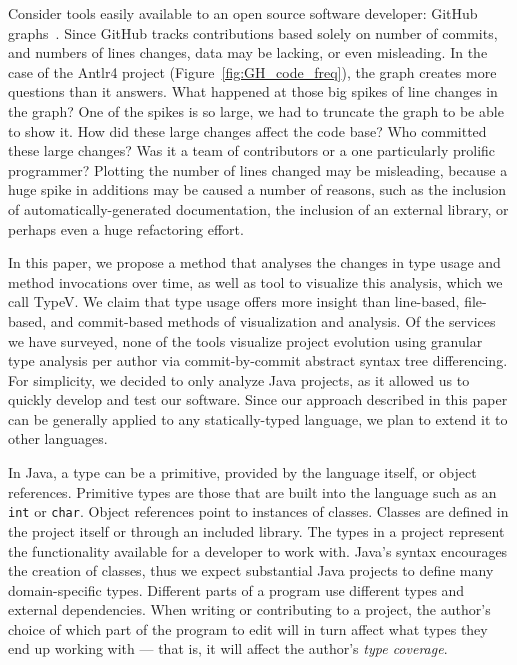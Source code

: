 \documentclass[conference]{IEEEtran}
\begin{document}
Consider tools easily available to an open source software developer: GitHub graphs~\cite{github-graphs}. Since GitHub tracks contributions based solely on number of commits, and numbers of lines changes, data may be lacking, or even misleading. In the case of the Antlr4 project (Figure~\ref{fig:GH_code_freq}), the graph creates more questions than it answers. What happened at those big spikes of line changes in the graph? One of the spikes is so large, we had to truncate the graph to be able to show it. How did these large changes affect the code base? Who committed these large changes? Was it a team of contributors or a one particularly prolific programmer? Plotting the number of lines changed may be misleading, because a huge spike in additions may be caused a number of reasons, such as the inclusion of automatically-generated documentation, the inclusion of an external library, or perhaps even a huge refactoring effort.

In this paper, we propose a method that analyses the changes in type usage and method invocations over time, as well as tool to visualize this analysis, which we call TypeV. We claim that type usage offers more insight than line-based, file-based, and commit-based methods of visualization and analysis. Of the services we have surveyed, none of the tools visualize project evolution using granular type analysis per author via commit-by-commit abstract syntax tree differencing. For simplicity, we decided to only analyze Java projects, as it allowed us to quickly develop and test our software. Since our approach described in this paper can be generally applied to any statically-typed language, we plan to extend it to other languages.

In Java, a type can be a primitive, provided by the language itself, or object references. Primitive types are those that are built into the language such as an \texttt{int} or \texttt{char}. Object references point to instances of classes. Classes are defined in the project itself or through an included library. The types in a project represent the functionality available for a developer to work with. Java’s syntax encourages the creation of classes, thus we expect substantial Java projects to define many domain-specific types. Different parts of a program use different types and external dependencies. When writing or contributing to a project, the author’s choice of which part of the program to edit will in turn affect what types they end up working with --- that is, it will affect the author’s \emph{type coverage}.
\end{document}
